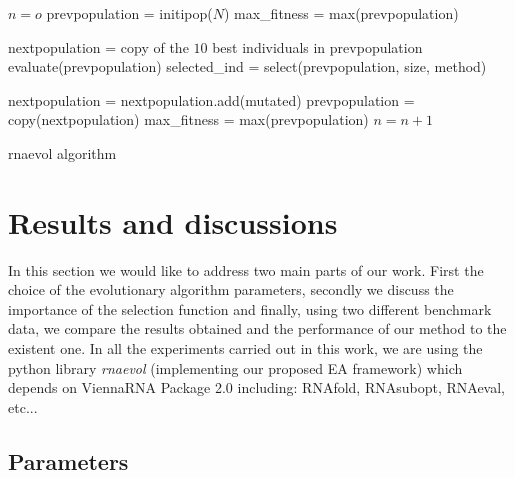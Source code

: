 \documentclass[english,12pt,a4paper]{article}
\theoremstyle{definition}
\begin{document}
\begin{algorithm}[H]
	$n = o $\;
	prevpopulation = initipop($N$)\; 
	max\_fitness = max(prevpopulation)\;
	
	 {
		nextpopulation = copy of the $10$ best individuals in prevpopulation\;
		evaluate(prevpopulation)\;
		selected\_ind = select(prevpopulation, size, method)\;
	
		nextpopulation = nextpopulation.add(mutated)\;
		prevpopulation = copy(nextpopulation)\;
		max\_fitness = max(prevpopulation)\;
		$ n = n + 1$\;
	}
	\caption{rnaevol algorithm}
\end{algorithm}

	\section{Results and discussions}
	In this section we would like to address two main parts of our work. First the choice of the evolutionary algorithm parameters, secondly we discuss the importance of the selection function and finally, using two different benchmark data, we compare the results obtained  and the performance of our method to the existent one. In all the experiments carried out in this work, we are using the python library \textit{rnaevol} (implementing our proposed EA framework) which depends on  ViennaRNA Package 2.0 \cite{lorenz2011viennarna} including: RNAfold, RNAsubopt, RNAeval, etc...
	\subsection{ Parameters}
\end{document}
